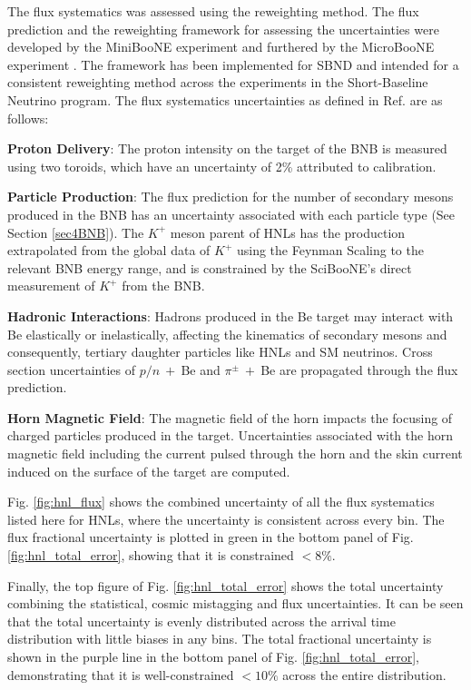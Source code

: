 The flux systematics was assessed using the reweighting method.
The flux prediction and the reweighting framework for assessing the uncertainties were developed by the MiniBooNE experiment and furthered by the MicroBooNE experiment \cite{BNBFlux, sbnweight_module}.
The framework has been implemented for SBND and intended for a consistent reweighting method across the experiments in the Short-Baseline Neutrino program.
The flux systematics uncertainties as defined in Ref. \cite{BNBFlux} are as follows:
\begin{coloritemize}
	\item \textbf{Proton Delivery}: The proton intensity on the target of the BNB is measured using two toroids, which have an uncertainty of 2\% attributed to calibration.
	\item \textbf{Particle Production}: The flux prediction for the number of secondary mesons produced in the BNB has an uncertainty associated with each particle type (See Section \ref{sec4BNB}). 
		The $K^+$ meson parent of HNLs has the production extrapolated from the global data of $K^+$ using the Feynman Scaling to the relevant BNB energy range, and is constrained by the SciBooNE's direct measurement of $K^+$ from the BNB.
	\item \textbf{Hadronic Interactions}: Hadrons produced in the Be target may interact with Be elastically or inelastically, affecting the kinematics of secondary mesons and consequently, tertiary daughter particles like HNLs and SM neutrinos.
		Cross section uncertainties of $p/n\ +\ $Be and $\pi^\pm\ +\ $Be are propagated through the flux prediction.
	\item \textbf{Horn Magnetic Field}: The magnetic field of the horn impacts the focusing of charged particles produced in the target.
		Uncertainties associated with the horn magnetic field including the current pulsed through the horn and the skin current induced on the surface of the target are computed.
\end{coloritemize}
Fig. \ref{fig:hnl_flux} shows the combined uncertainty of all the flux systematics listed here for HNLs, where the uncertainty is consistent across every bin.
The flux fractional uncertainty is plotted in green in the bottom panel of Fig. \ref{fig:hnl_total_error}, showing that it is constrained $< 8\%$.

Finally, the top figure of Fig. \ref{fig:hnl_total_error} shows the total uncertainty combining the statistical, cosmic mistagging and flux uncertainties.
It can be seen that the total uncertainty is evenly distributed across the arrival time distribution with little biases in any bins. 
The total fractional uncertainty is shown in the purple line in the bottom panel of Fig. \ref{fig:hnl_total_error}, demonstrating that it is well-constrained $< 10\%$ across the entire distribution.


